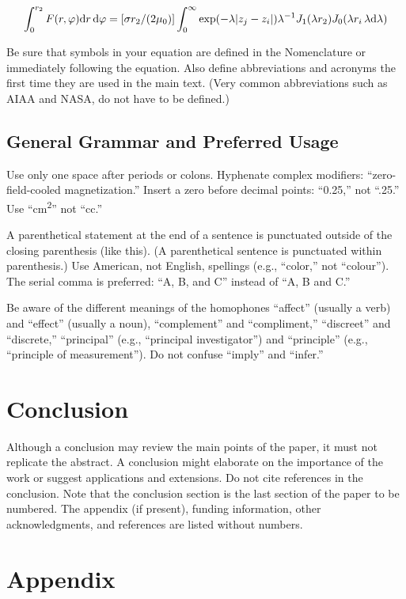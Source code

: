 \documentclass[journal ]{new-aiaa}
\begin{document}
\begin{equation}
\label{sample:equation}
\int^{r_2}_0 F(r,\varphi){\rm d}r\,{\rm d}\varphi = [\sigma r_2/(2\mu_0)]\int^{\infty}_0\exp(-\lambda|z_j-z_i|)\lambda^{-1}J_1 (\lambda r_2)J_0 (\lambda r_i\,\lambda {\rm d}\lambda)
\end{equation}

Be sure that symbols in your equation are defined in the Nomenclature or immediately following the equation. Also define abbreviations and acronyms the first time they are used in the main text. (Very common abbreviations such as AIAA and NASA, do not have to be defined.)

\subsection{General Grammar and Preferred Usage}
Use only one space after periods or colons. Hyphenate complex modifiers: ``zero-field-cooled magnetization.'' Insert a zero before decimal points: ``0.25,'' not ``.25.'' Use ``\si{\centi\meter\squared}'' not ``cc.'' 

A parenthetical statement at the end of a sentence is punctuated outside of the closing parenthesis (like this). (A parenthetical sentence is punctuated within parenthesis.) Use American, not English, spellings (e.g., “color,” not “colour”). The serial comma is preferred: “A, B, and C” instead of “A, B and C.”

Be aware of the different meanings of the homophones “affect” (usually a verb) and “effect” (usually a noun), “complement” and “compliment,” “discreet” and “discrete,” “principal” (e.g., “principal investigator”) and “principle” (e.g., “principle of measurement”). Do not confuse “imply” and “infer.”

\section{Conclusion}
Although a conclusion may review the main points of the paper, it must not replicate the abstract. A conclusion might elaborate on the importance of the work or suggest applications and extensions. Do not cite references in the conclusion. Note that the conclusion section is the last section of the paper to be numbered. The appendix (if present), funding information, other acknowledgments, and references are listed without numbers.

\section*{Appendix}
\end{document}
